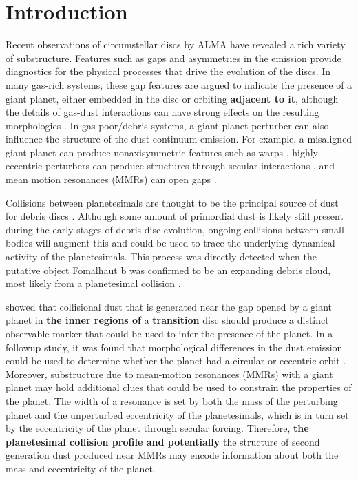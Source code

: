 \documentclass[fleqn,usenatbib]{mnras}
\begin{document}
\section{Introduction} \label{sec:intro}

Recent observations of circumstellar discs by ALMA have revealed a rich variety of substructure. Features such as gaps and asymmetries 
\citep{2015ApJ...808L...3A, 2016Sci...353.1519P, PhysRevLett.117.251101, 2016ApJ...820L..40A, 2016Natur.535..258C} in the emission provide 
diagnostics for the physical processes that drive the evolution of the discs. In many gas-rich systems, these gap features are argued to indicate the 
presence of a giant planet, either embedded in the disc \citep{2015MNRAS.453L..73D} or orbiting \textbf{adjacent to it}, although the details of gas-dust 
interactions can have strong effects on the resulting morphologies
\citep{2018ApJ...866..110D}. In gas-poor/debris systems, a giant
planet perturber can also influence 
the structure of the dust continuum emission. For example, a misaligned giant planet can produce nonaxisymmetric features such as warps 
\citep{2001A&A...370..447A}, highly eccentric perturbers can produce structures through secular interactions 
\citep{2014MNRAS.443.2541P, 2015MNRAS.448.3679P}, and mean motion resonances (MMRs) can open gaps
\citep{2015ApJ...798...83N, 2016ApJ...818..159T, 2018ApJ...857....3T}.

Collisions between planetesimals are thought to be the principal source of dust for debris discs \citep[see][]{2008ARA&A..46..339W}.  Although some 
amount of primordial dust is likely still present during the early stages of debris disc evolution, ongoing collisions between small bodies will augment 
this and could be used to trace the underlying dynamical activity of the planetesimals. This process was directly detected when the putative object 
Fomalhaut b was confirmed to be an expanding debris cloud, most likely from a planetesimal collision \citep{2020PNAS..117.9712G}. 

\citet{2013ApJ...777L..31D} showed that collisional dust that is generated near the gap opened by a giant planet in \textbf{the inner regions of} a \textbf{transition} disc should 
produce a distinct observable marker that could be used to infer the presence of the planet. In a followup study, it was found that morphological 
differences in the dust emission could be used to determine whether the planet had a circular or eccentric orbit \citep{2016ApJ...820...29D}. Moreover, 
substructure due to mean-motion resonances (MMRs) with a giant planet may hold additional clues that could be used to constrain the properties of 
the planet.  The width of a resonance is set by both the mass of the perturbing planet and the unperturbed eccentricity of the planetesimals, 
which is in turn set by the eccentricity of the planet through secular forcing. Therefore, \textbf{the planetesimal collision profile and potentially} the structure of second generation 
dust produced near MMRs may encode information about both the mass and eccentricity of the planet.
\end{document}
